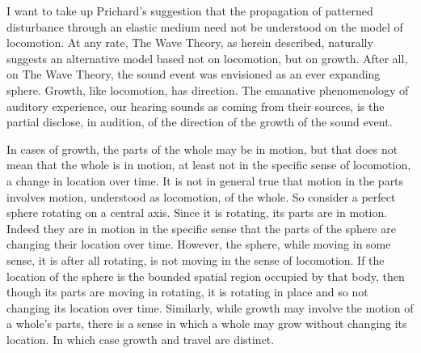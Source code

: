 

I want to take up Prichard's suggestion that the propagation of patterned disturbance through an elastic medium need not be understood on the model of locomotion. At any rate, The Wave Theory, as herein described, naturally suggests an alternative model based not on locomotion, but on growth. After all, on The Wave Theory, the sound event was envisioned as an ever expanding sphere. Growth, like locomotion, has direction. The emanative phenomenology of auditory experience, our hearing sounds as coming from their sources, is the partial disclose, in audition, of the direction of the growth of the sound event.

In cases of growth, the parts of the whole may be in motion, but that does not mean that the whole is in motion, at least not in the specific sense of locomotion, a change in location over time. It is not in general true that motion in the parts involves motion, understood as locomotion, of the whole. So consider a perfect sphere rotating on a central axis. Since it is rotating, its parts are in motion. Indeed they are in motion in the specific sense that the parts of the sphere are changing their location over time. However, the sphere, while moving in some sense, it is after all rotating, is not moving in the sense of locomotion. If the location of the sphere is the bounded spatial region occupied by that body, then though its parts are moving in rotating, it is rotating in place and so not changing its location over time. Similarly, while growth may involve the motion of a whole's parts, there is a sense in which a whole may grow without changing its location. In which case growth and travel are distinct.

